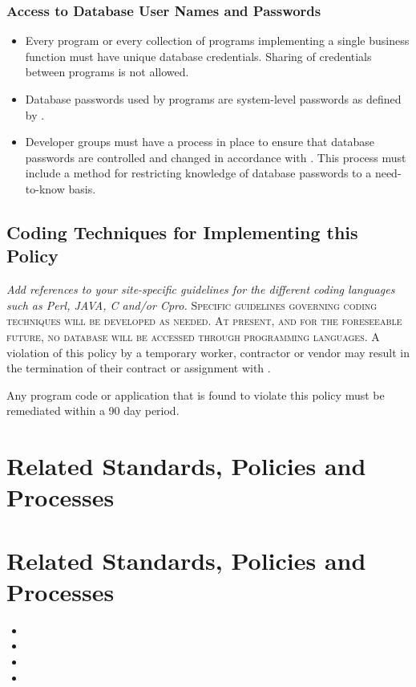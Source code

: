 \subsubsection{Access to Database User Names and Passwords}
\begin{itemize}
\item
Every program or every collection of programs implementing a single business function must have unique database credentials.  
Sharing of credentials between programs is not allowed. 
\item
Database passwords used by programs are system-level passwords as defined by . 
\item
Developer groups must have a process in place to ensure that database passwords are controlled and changed in accordance with .  
This process must include a method for restricting knowledge of database passwords to a need-to-know basis. 
\end{itemize}
\subsection{Coding Techniques for Implementing this Policy}
\textit{Add references to your site-specific guidelines for the different coding languages such as Perl, JAVA, C and/or Cpro.}
\textsc{Specific guidelines governing coding techniques will be developed as needed.  %
At present, and for the foreseeable future, no database will be accessed through programming languages.%
}%
\CommonPolicyCompliance
A violation of this policy by a temporary worker, contractor\oxford{} or vendor may result in the termination of their contract or assignment with \CompanyName{}.

Any program code or application that is found to violate this policy must be remediated within a 90 day period.  
\section{Related Standards, Policies\oxford{} and Processes}
\section{Related Standards, Policies and Processes}
\begin{itemize}
\item {}%
\item {}
\item {}
\item {}
\end{itemize}
